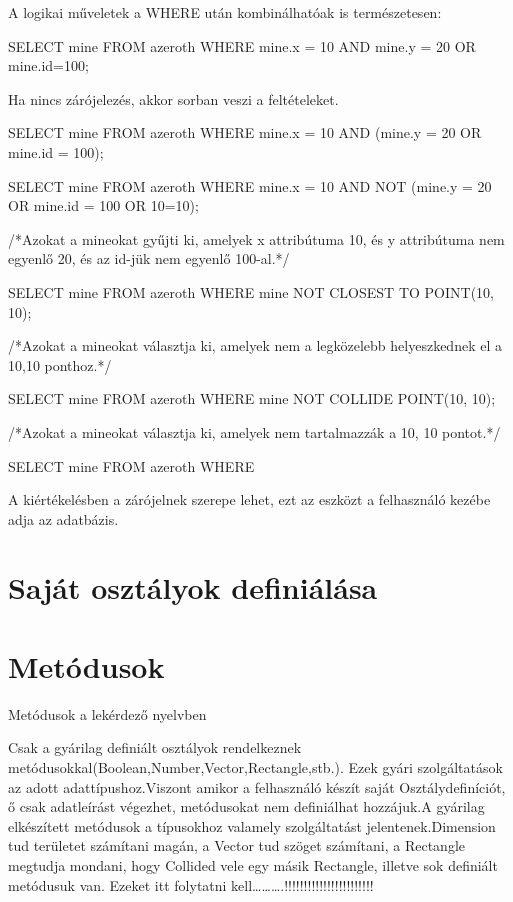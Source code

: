 A logikai műveletek a WHERE után kombinálhatóak is természetesen:
\begin{sql}
SELECT mine FROM azeroth WHERE mine.x = 10 AND mine.y = 20 OR mine.id=100;
\end{sql}
Ha nincs zárójelezés, akkor sorban veszi a feltételeket.
\begin{sql}
SELECT mine FROM azeroth WHERE mine.x = 10 AND (mine.y = 20 OR mine.id = 100);
\end{sql}

\begin{sql}
SELECT mine FROM azeroth WHERE mine.x = 10 AND NOT (mine.y = 20 OR mine.id = 100 OR 10=10);
\end{sql}
/*Azokat a mineokat gyűjti ki, amelyek x attribútuma 10, és y attribútuma nem egyenlő 20, és az id-jük nem egyenlő 100-al.*/
\begin{sql}

\begin{sql}
SELECT mine FROM azeroth WHERE mine NOT CLOSEST TO POINT(10, 10);
\end{sql}

/*Azokat a mineokat választja ki, amelyek nem a legközelebb helyeszkednek el a 10,10 ponthoz.*/
\begin{sql}
SELECT mine FROM azeroth WHERE mine NOT COLLIDE POINT(10, 10);
\end{sql}
/*Azokat a mineokat választja ki, amelyek nem tartalmazzák a 10, 10 pontot.*/
\begin{sql}
SELECT mine FROM azeroth WHERE 
\end{sql}

A kiértékelésben a zárójelnek szerepe lehet, ezt az eszközt a felhasználó kezébe adja az adatbázis.

\section{Saját osztályok definiálása}

\section{Metódusok}

Metódusok a lekérdező nyelvben

Csak a gyárilag definiált osztályok rendelkeznek metódusokkal(Boolean,Number,Vector,Rectangle,stb.).
Ezek gyári szolgáltatások az adott adattípushoz.Viszont amikor a felhasználó készít saját Osztálydefiníciót, ő csak adatleírást végezhet, metódusokat nem definiálhat hozzájuk.A gyárilag elkészített metódusok a típusokhoz valamely szolgáltatást jelentenek.Dimension tud területet számítani magán, a Vector tud szöget számítani, a Rectangle megtudja mondani, hogy Collided vele egy másik Rectangle, illetve sok definiált metódusuk van. Ezeket itt folytatni kell……….!!!!!!!!!!!!!!!!!!!!!!! 


\end{sql}
